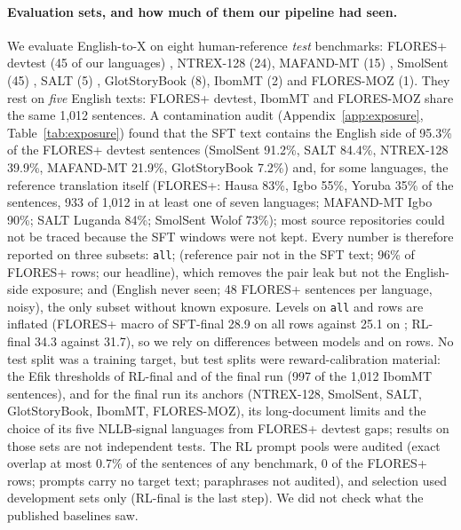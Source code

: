 \paragraph{Evaluation sets, and how much of them our pipeline had seen.} We evaluate English-to-X on eight human-reference \emph{test} benchmarks: FLORES+ devtest (45 of our languages) \citep{oldi2025floresplus}, NTREX-128 (24), MAFAND-MT (15) \citep{adelani2022mafand}, SmolSent (45) \citep{caswell2025smol}, SALT (5) \citep{akera2022salt}, GlotStoryBook (8), IbomMT (2) and FLORES-MOZ (1). They rest on \emph{five} English texts: FLORES+ devtest, IbomMT and FLORES-MOZ share the same 1,012 sentences. A contamination audit (Appendix~\ref{app:exposure}, Table~\ref{tab:exposure}) found that the SFT text contains the English side of 95.3\% of the FLORES+ devtest sentences (SmolSent 91.2\%, SALT 84.4\%, NTREX-128 39.9\%, MAFAND-MT 21.9\%, GlotStoryBook 7.2\%) and, for some languages, the reference translation itself (FLORES+: Hausa 83\%, Igbo 55\%, Yoruba 35\% of the sentences, 933 of 1,012 in at least one of seven languages; MAFAND-MT Igbo 90\%; SALT Luganda 84\%; SmolSent Wolof 73\%); most source repositories could not be traced because the SFT windows were not kept. Every number is therefore reported on three subsets: \texttt{all}; \nopair{} (reference pair not in the SFT text; 96\% of FLORES+ rows; our headline), which removes the pair leak but not the English-side exposure; and \clean{} (English never seen; 48 FLORES+ sentences per language, noisy), the only subset without known exposure. Levels on \texttt{all} and \nopair{} rows are inflated (FLORES+ macro of SFT-final 28.9 on all rows against 25.1 on \clean{}; RL-final 34.3 against 31.7), so we rely on differences between models and on \clean{} rows. No test split was a training target, but test splits were reward-calibration material: the Efik thresholds of RL-final and of the final run (997 of the 1,012 IbomMT sentences), and for the final run its anchors (NTREX-128, SmolSent, SALT, GlotStoryBook, IbomMT, FLORES-MOZ), its long-document limits and the choice of its five NLLB-signal languages from FLORES+ devtest gaps; results on those sets are not independent tests. The RL prompt pools were audited (exact overlap at most 0.7\% of the sentences of any benchmark, 0 of the FLORES+ \clean{} rows; prompts carry no target text; paraphrases not audited), and selection used development sets only (RL-final is the last step). We did not check what the published baselines saw.

